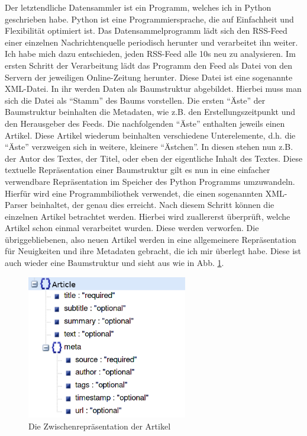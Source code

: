 \documentclass[12pt,ngerman,a4paperpaper,]{paper}
\begin{document}
Der letztendliche Datensammler ist ein Programm, welches ich in Python
geschrieben habe. Python ist eine Programmiersprache, die auf
Einfachheit und Flexibilität optimiert ist. Das Datensammelprogramm lädt
sich den RSS-Feed einer einzelnen Nachrichtenquelle periodisch herunter
und verarbeitet ihn weiter. Ich habe mich dazu entschieden, jeden
RSS-Feed alle 10s neu zu analysieren. Im ersten Schritt der Verarbeitung
lädt das Programm den Feed als Datei von den Servern der jeweiligen
Online-Zeitung herunter. Diese Datei ist eine sogenannte XML-Datei. In
ihr werden Daten als Baumstruktur abgebildet. Hierbei muss man sich die
Datei als ``Stamm'' des Baums vorstellen. Die ersten ``Äste'' der
Baumstruktur beinhalten die Metadaten, wie z.B. den Erstellungszeitpunkt
und den Herausgeber des Feeds. Die nachfolgenden ``Äste'' enthalten
jeweils einen Artikel. Diese Artikel wiederum beinhalten verschiedene
Unterelemente, d.h. die ``Äste'' verzweigen sich in weitere, kleinere
``Ästchen''. In diesen stehen nun z.B. der Autor des Textes, der Titel,
oder eben der eigentliche Inhalt des Textes. Diese textuelle
Repräsentation einer Baumstruktur gilt es nun in eine einfacher
verwendbare Repräsentation im Speicher des Python Programms umzuwandeln.
Hierfür wird eine Programmbiliothek verwendet, die einen sogenannten
XML-Parser beinhaltet, der genau dies erreicht. Nach diesem Schritt
können die einzelnen Artikel betrachtet werden. Hierbei wird zuallererst
überprüft, welche Artikel schon einmal verarbeitet wurden. Diese werden
verworfen. Die übriggebliebenen, also neuen Artikel werden in eine
allgemeinere Repräsentation für Neuigkeiten und ihre Metadaten gebracht,
die ich mir überlegt habe. Diese ist auch wieder eine Baumstruktur und
sieht aus wie in Abb. \ref{fig:ir}.

\begin{figure}
\centering
\includegraphics[width=7.00000cm]{img/ir.png}
\caption{Die Zwischenrepräsentation der Artikel\label{fig:ir}}
\end{figure}
\end{document}
